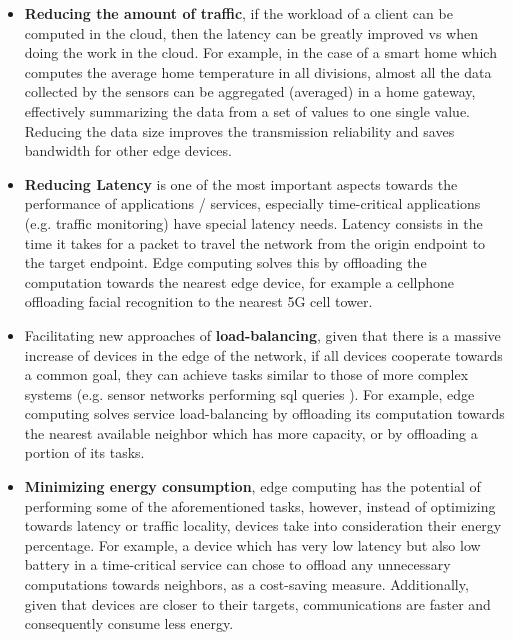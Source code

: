 \begin{itemize}

    \item \textbf{Reducing the amount of traffic}, if the workload of a client can be computed in the cloud, then the latency can be greatly improved vs when doing the work in the cloud. For example, in the case of a smart home which computes the average home temperature in all divisions, almost all the data collected by the sensors can be aggregated (averaged) in a home gateway, effectively summarizing the data from a set of values to one single value. Reducing the data size improves the transmission reliability and saves bandwidth for other edge devices.
    
    \item \textbf{Reducing Latency} is one of the most important aspects towards the performance of applications / services, especially time-critical applications (e.g. traffic monitoring) have special latency needs. Latency consists in the time it takes for a packet to travel the network from the origin endpoint to the target endpoint. Edge computing solves this by offloading the computation towards the nearest edge device, for example a cellphone offloading facial recognition to the nearest 5G cell tower.

    \item Facilitating new approaches of \textbf{load-balancing}, given that there is a massive increase of devices in the edge of the network, if all devices cooperate towards a common goal, they can achieve tasks similar to those of more complex systems (e.g. sensor networks performing sql queries \cite{Madden2002}). For example, edge computing solves service load-balancing by offloading its computation towards the nearest available neighbor which has more capacity, or by offloading a portion of its tasks.
    
    \item \textbf{Minimizing energy consumption}, edge computing has the potential of performing some of the aforementioned tasks, however, instead of optimizing towards latency or traffic locality, devices take into consideration their energy percentage. For example, a device which has very low latency but also low battery in a time-critical service can chose to offload any unnecessary computations towards neighbors, as a cost-saving measure. Additionally, given that devices are closer to their targets, communications are faster and consequently consume less energy.
    
\end{itemize}


